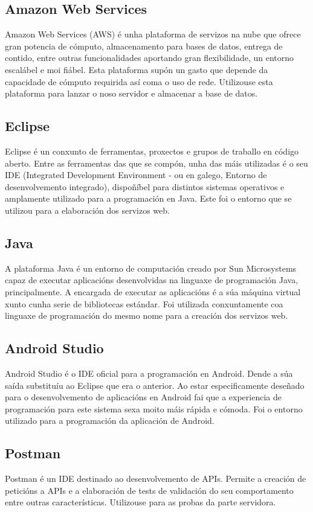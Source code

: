 \subsection{Amazon Web Services}
Amazon Web Services (AWS) \cite{aws} é unha plataforma de servizos na nube que ofrece gran potencia de cómputo, almacenamento para bases de datos, entrega de contido, entre outras funcionalidades aportando gran flexibilidade, un entorno escalábel e moi fiábel. Esta plataforma supón un gasto que depende da capacidade de cómputo requirida así coma o uso de rede. Utilizouse esta plataforma para lanzar o noso servidor e almacenar a base de datos.


\subsection{Eclipse}
Eclipse \cite{eclipse} é un conxunto de ferramentas, proxectos e grupos de traballo en código aberto. Entre as ferramentas das que se compón, unha das máis utilizadas é o seu IDE (Integrated Development Environment - ou en galego, Entorno de desenvolvemento integrado), dispoñíbel para distintos sistemas operativos e amplamente utilizado para a programación en Java. Este foi o entorno que se utilizou para a elaboración dos servizos web.


\subsection{Java}
A plataforma Java \cite{java} é un entorno de computación creado por Sun Microsystems capaz de executar aplicacións desenvolvidas na linguaxe de programación Java, principalmente. A encargada de executar as aplicacións é a súa máquina virtual xunto cunha serie de bibliotecas estándar. Foi utilizada conxuntamente coa linguaxe de programación do mesmo nome para a creación dos servizos web.


\subsection{Android Studio}
Android Studio \cite{androidStudio} é o IDE oficial para a programación en Android. Dende a súa saída substituíu ao Eclipse que era o anterior. Ao estar especificamente deseñado para o desenvolvemento de aplicacións en Android fai que a experiencia de programación para este sistema sexa moito máis rápida e cómoda. Foi o entorno utilizado para a programación da aplicación de Android.


\subsection{Postman}
Postman \cite{postman} é un IDE destinado ao desenvolvemento de APIs. Permite a creación de peticións a APIs e a elaboración de tests de validación do seu comportamento entre outras características. Utilizouse para as probas da parte servidora.


